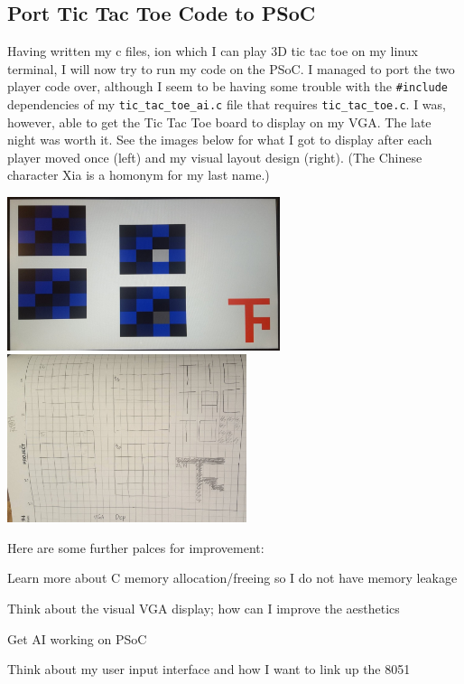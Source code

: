 \documentclass[12pt,twoside]{article}
\newenvironment{tight_itemize}{
\begin{itemize}
  \setlength{\itemsep}{0pt}
  \setlength{\parskip}{0pt}
}{\end{itemize}}
\begin{document}
\subsection{Port Tic Tac Toe Code to PSoC}
Having written my c files, ion which I can play 3D tic tac toe on my linux terminal, I will now try to run my code on the PSoC. I managed to port the two player code over, although I seem to be having some trouble with the \texttt{\#include} dependencies of my \texttt{tic\_tac\_toe\_ai.c} file that requires \texttt{tic\_tac\_toe.c}. I was, however, able to get the Tic Tac Toe board to display on my VGA. The late night was worth it. See the images below for what I got to display after each player moved once (left) and my visual layout design (right). (The Chinese character Xia is a homonym for my last name.)
\begin{center} \includegraphics[width = 80mm]{Pics/4-28a.jpg}
\includegraphics[width = 70mm]{Pics/4-28b.jpg}  \end{center}

Here are some further palces for improvement:
\begin{tight_itemize}
\item Learn more about C memory allocation/freeing so I do not have memory leakage
\item Think about the visual VGA display; how can I improve the aesthetics
\item Get AI working on PSoC
\item Think about my user input interface and how I want to link up the 8051
\end{tight_itemize}
\end{document}

